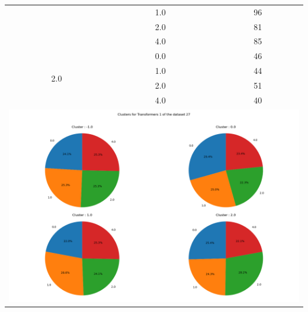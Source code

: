 \begin{longtable}{|c|c|c|c|c|}
& \multicolumn{2}{c|}{1.0} & \multicolumn{2}{c|}{96} \\
& \multicolumn{2}{c|}{2.0} & \multicolumn{2}{c|}{81} \\
& \multicolumn{2}{c|}{4.0} & \multicolumn{2}{c|}{85} \\
\hline
\multirow{4}{*}{2.0} & \multicolumn{2}{c|}{0.0} & \multicolumn{2}{c|}{46} \\
& \multicolumn{2}{c|}{1.0} & \multicolumn{2}{c|}{44} \\
& \multicolumn{2}{c|}{2.0} & \multicolumn{2}{c|}{51} \\
& \multicolumn{2}{c|}{4.0} & \multicolumn{2}{c|}{40} \\
\hline
\multicolumn{5}{|c|}{\includegraphics[width=0.8\linewidth]{img/annexes/27/clustering_pie_charts/Transformers 1.png}} \\
\end{longtable}


